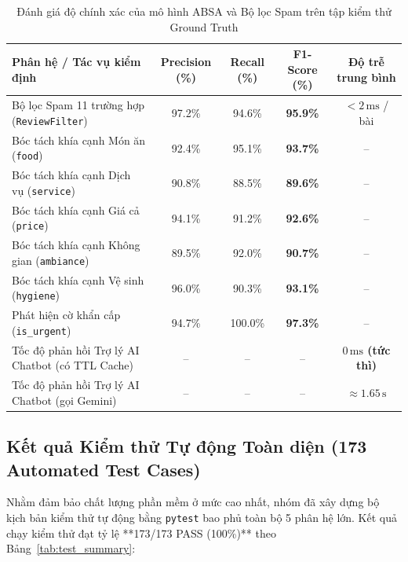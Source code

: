 \documentclass[12pt, a4paper]{article}
\begin{document}
\begin{table}[H]
\centering
\caption{Đánh giá độ chính xác của mô hình ABSA và Bộ lọc Spam trên tập kiểm thử Ground Truth}
\label{tab:evaluation_metrics}
\vspace{0.15cm}
\footnotesize
\begin{tabularx}{\textwidth}{l c c c c}
\toprule
\rowcolor{blue!8}
\textbf{Phân hệ / Tác vụ kiểm định} & \textbf{Precision (\%)} & \textbf{Recall (\%)} & \textbf{F1-Score (\%)} & \textbf{Độ trễ trung bình} \\
\midrule
Bộ lọc Spam 11 trường hợp (\texttt{ReviewFilter}) & 97.2\% & 94.6\% & \textbf{95.9\%} & $< 2\,\mathrm{ms}$ / bài \\
Bóc tách khía cạnh Món ăn (\texttt{food}) & 92.4\% & 95.1\% & \textbf{93.7\%} & -- \\
Bóc tách khía cạnh Dịch vụ (\texttt{service}) & 90.8\% & 88.5\% & \textbf{89.6\%} & -- \\
Bóc tách khía cạnh Giá cả (\texttt{price}) & 94.1\% & 91.2\% & \textbf{92.6\%} & -- \\
Bóc tách khía cạnh Không gian (\texttt{ambiance}) & 89.5\% & 92.0\% & \textbf{90.7\%} & -- \\
Bóc tách khía cạnh Vệ sinh (\texttt{hygiene}) & 96.0\% & 90.3\% & \textbf{93.1\%} & -- \\
Phát hiện cờ khẩn cấp (\texttt{is\_urgent}) & 94.7\% & 100.0\% & \textbf{97.3\%} & -- \\
Tốc độ phản hồi Trợ lý AI Chatbot (có TTL Cache) & -- & -- & -- & \textbf{$0\,\mathrm{ms}$ (tức thì)} \\
Tốc độ phản hồi Trợ lý AI Chatbot (gọi Gemini) & -- & -- & -- & $\approx 1.65\,\mathrm{s}$ \\
\bottomrule
\end{tabularx}
\end{table}

\subsection{Kết quả Kiểm thử Tự động Toàn diện (173 Automated Test Cases)}
Nhằm đảm bảo chất lượng phần mềm ở mức cao nhất, nhóm đã xây dựng bộ kịch bản kiểm thử tự động bằng \texttt{pytest} bao phủ toàn bộ 5 phân hệ lớn. Kết quả chạy kiểm thử đạt tỷ lệ **173/173 PASS (100\%)** theo Bảng~\ref{tab:test_summary}:
\end{document}
